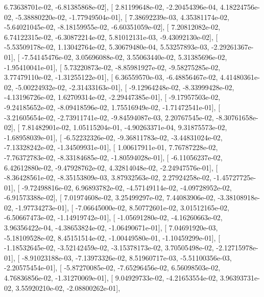 \documentclass{article}
\begin{document}
          6.73638701e-02,  -6.81385868e-02],
       [  2.81199648e-02,  -2.20454396e-04,   4.18224756e-02,
         -5.38880220e-02,  -1.77949504e-01],
       [  7.38692239e-03,   4.35381174e-02,  -5.64021045e-02,
         -8.18159955e-02,  -6.60351059e-02],
       [  7.20812082e-02,   6.74122315e-02,  -6.30872214e-02,
          5.81012131e-03,  -9.43092130e-02],
       [ -5.53509178e-02,   1.13042764e-02,   5.30679480e-04,
          5.53257893e-03,  -2.29261367e-01],
       [ -7.54145476e-02,   3.05696088e-02,   3.55063440e-02,
          5.31385696e-02,  -1.95410041e-01],
       [  5.73220873e-02,  -8.85981927e-02,  -9.58275285e-02,
          3.77479110e-02,  -1.31255122e-01],
       [  6.36559570e-03,  -6.48856467e-02,   4.41480361e-02,
         -5.00224932e-02,  -2.31433163e-01],
       [ -9.12964248e-02,  -8.33999428e-02,  -4.13196726e-02,
          1.62709314e-02,  -2.29447385e-01],
       [ -9.17957503e-02,  -9.24185652e-02,  -8.09418596e-02,
          1.75516949e-02,  -1.71472541e-01],
       [ -3.21605654e-02,  -2.73911741e-02,  -9.84594087e-03,
          2.20767545e-02,  -8.30761658e-02],
       [  7.81482901e-02,   1.05115204e-01,  -4.90263371e-04,
          9.31875573e-02,  -1.68958039e-01],
       [ -6.52232326e-02,  -9.36811783e-02,  -3.44831024e-02,
         -7.13328242e-02,  -1.34509931e-01],
       [  1.00617911e-01,   7.76787228e-02,  -7.76372783e-02,
         -8.33184685e-02,  -1.80594028e-01],
       [ -6.11056237e-02,   6.42612880e-02,  -9.47928762e-02,
          4.32814048e-02,  -2.24947576e-01],
       [ -8.36428561e-02,  -8.35153809e-03,   3.87932563e-02,
          2.27924258e-02,  -1.45727725e-01],
       [ -9.72498816e-02,   6.96893782e-02,  -4.57149114e-02,
         -4.09728952e-02,  -6.91573388e-02],
       [  7.01974608e-02,   3.25499297e-02,   7.44083906e-02,
         -3.38108918e-02,  -1.97734273e-01],
       [ -7.06645000e-02,   8.50772601e-02,   3.01512165e-02,
         -6.50667473e-02,  -1.14919742e-01],
       [ -1.05691280e-02,  -4.16260663e-02,   3.96356422e-04,
         -4.38653824e-02,  -1.06490671e-01],
       [  7.04691920e-03,  -5.18109528e-02,   8.45151514e-02,
         -1.00449580e-01,  -1.10459299e-01],
       [ -1.18532645e-02,  -3.52142459e-02,  -3.15378173e-02,
          3.70505498e-02,  -2.12715978e-01],
       [ -8.91023188e-03,  -7.13973326e-02,   8.51960717e-03,
         -5.51100356e-03,  -2.20575454e-01],
       [ -5.87270085e-02,  -7.65296456e-02,   6.56098503e-02,
          4.76836856e-02,  -1.31270069e-01],
       [  9.04929733e-02,  -4.21653554e-02,   3.96393731e-02,
          3.55920210e-02,  -2.08800262e-01],
\end{document}
